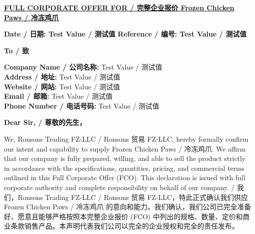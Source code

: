 \documentclass[a4paper,11pt]{article}
\begin{document}
\setlength{\parindent}{0pt}

\begin{center}
  {\Large\textbf{\underline{FULL CORPORATE OFFER FOR / 完整企业报价  Frozen Chicken Paws / 冷冻鸡爪}}}
\end{center}

\vspace{0.3cm}

\noindent\textbf{Date / 日期: Test Value / 测试值} \hfill \textbf{Reference / 编号: Test Value / 测试值}

\vspace{0.5cm}

\noindent\textbf{To / 致}

\vspace{0.2cm}

\noindent\textbf{Company Name / 公司名称:} Test Value / 测试值\\
\textbf{Address / 地址:} Test Value / 测试值\\
\textbf{Website / 网站:} Test Value / 测试值\\
\textbf{Email / 邮箱:} Test Value / 测试值\\
\textbf{Phone Number / 电话号码:} Test Value / 测试值

\vspace{0.4cm}

\noindent\textbf{Dear Sir, / 尊敬的先生，}

\vspace{0.3cm}

\noindent We, Ronsons Trading FZ-LLC / Ronsons 贸易 FZ-LLC, hereby formally confirm our intent and capability to supply Frozen Chicken Paws / 冷冻鸡爪. We affirm that our company is fully prepared, willing, and able to sell the product strictly in accordance with the specifications, quantities, pricing, and commercial terms outlined in this Full Corporate Offer (FCO). This declaration is issued with full corporate authority and complete responsibility on behalf of our company. / 我们，Ronsons Trading FZ-LLC / Ronsons 贸易 FZ-LLC，特此正式确认我们供应 Frozen Chicken Paws / 冷冻鸡爪 的意向和能力。我们确认，我们公司已完全准备好、愿意且能够严格按照本完整企业报价 (FCO) 中列出的规格、数量、定价和商业条款销售产品。本声明代表我们公司以完全的企业授权和完全的责任发布。

\vspace{0.4cm}
\end{document}
